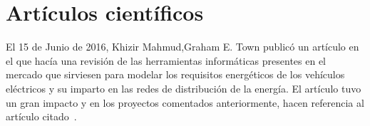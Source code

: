 \section{Artículos científicos}

El 15 de Junio de 2016, Khizir Mahmud,Graham E. Town publicó un artículo en el que hacía una revisión de las herramientas informáticas presentes en el mercado que sirviesen para modelar los requisitos energéticos de los vehículos eléctricos y su imparto en las redes de distribución de la energía. El artículo tuvo un gran impacto y en los proyectos comentados anteriormente, hacen referencia al artículo citado~\cite{pdf:articuloAplicacionesRelacionadas}. 


